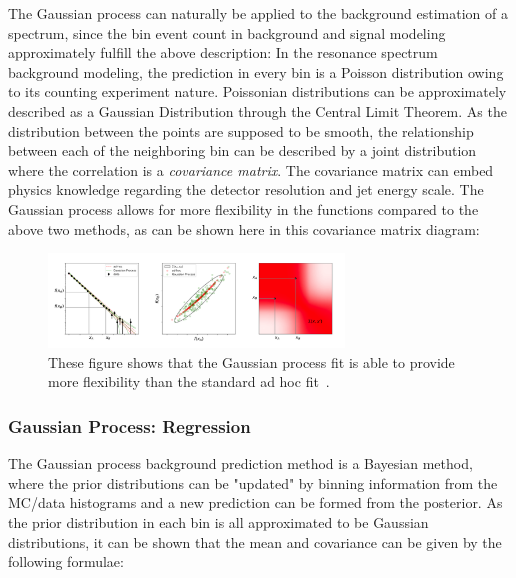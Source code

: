     The Gaussian process can naturally be applied to the background estimation of a spectrum, since the bin event count in background and signal modeling approximately fulfill the above description: In the resonance spectrum background modeling, the prediction in every bin is a Poisson distribution owing to its counting experiment nature. Poissonian distributions can be approximately described as a Gaussian Distribution through the Central Limit Theorem. As the distribution between the points are supposed to be smooth, the relationship between each of the neighboring bin can be described by a joint distribution where the correlation is a \textit{covariance matrix}. The covariance matrix can embed physics knowledge regarding the detector resolution and jet energy scale. The Gaussian process allows for more flexibility in the functions compared to the above two methods, as can be shown here in this covariance matrix diagram:

    \begin{figure}[!htb]
        \begin{center}
            \includegraphics[width=0.7\textwidth]{figures/chapter_analysismethod/GP}
            \caption{
                These figure shows that the Gaussian process fit is able to provide more flexibility than the standard ad hoc fit~\cite{frate2017modeling}.
            }
            \label{fig:GaussianProcess}
        \end{center}
    \end{figure}
    \FloatBarrier


\subsubsection{Gaussian Process: Regression}

    The Gaussian process background prediction method is a Bayesian method, where the prior distributions can be "updated" by binning information from the MC/data histograms and a new prediction can be formed from the posterior. As the prior distribution in each bin is all approximated to be Gaussian distributions, it can be shown that the mean and covariance can be given by the following formulae:

